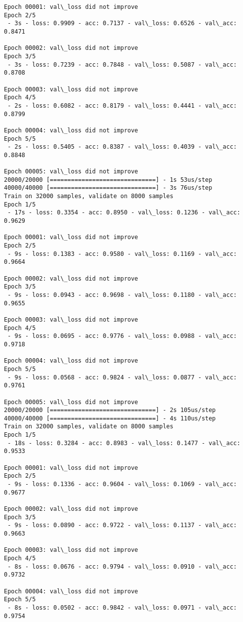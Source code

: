 \documentclass[11pt]{article}
\begin{document}
\begin{Verbatim}[commandchars=\\\{\}]
Epoch 00001: val\_loss did not improve
Epoch 2/5
 - 3s - loss: 0.9909 - acc: 0.7137 - val\_loss: 0.6526 - val\_acc: 0.8471

Epoch 00002: val\_loss did not improve
Epoch 3/5
 - 3s - loss: 0.7239 - acc: 0.7848 - val\_loss: 0.5087 - val\_acc: 0.8708

Epoch 00003: val\_loss did not improve
Epoch 4/5
 - 2s - loss: 0.6082 - acc: 0.8179 - val\_loss: 0.4441 - val\_acc: 0.8799

Epoch 00004: val\_loss did not improve
Epoch 5/5
 - 2s - loss: 0.5405 - acc: 0.8387 - val\_loss: 0.4039 - val\_acc: 0.8848

Epoch 00005: val\_loss did not improve
20000/20000 [==============================] - 1s 53us/step
40000/40000 [==============================] - 3s 76us/step
Train on 32000 samples, validate on 8000 samples
Epoch 1/5
 - 17s - loss: 0.3354 - acc: 0.8950 - val\_loss: 0.1236 - val\_acc: 0.9629

Epoch 00001: val\_loss did not improve
Epoch 2/5
 - 9s - loss: 0.1383 - acc: 0.9580 - val\_loss: 0.1169 - val\_acc: 0.9664

Epoch 00002: val\_loss did not improve
Epoch 3/5
 - 9s - loss: 0.0943 - acc: 0.9698 - val\_loss: 0.1180 - val\_acc: 0.9655

Epoch 00003: val\_loss did not improve
Epoch 4/5
 - 9s - loss: 0.0695 - acc: 0.9776 - val\_loss: 0.0988 - val\_acc: 0.9718

Epoch 00004: val\_loss did not improve
Epoch 5/5
 - 9s - loss: 0.0568 - acc: 0.9824 - val\_loss: 0.0877 - val\_acc: 0.9761

Epoch 00005: val\_loss did not improve
20000/20000 [==============================] - 2s 105us/step
40000/40000 [==============================] - 4s 110us/step
Train on 32000 samples, validate on 8000 samples
Epoch 1/5
 - 18s - loss: 0.3284 - acc: 0.8983 - val\_loss: 0.1477 - val\_acc: 0.9533

Epoch 00001: val\_loss did not improve
Epoch 2/5
 - 9s - loss: 0.1336 - acc: 0.9604 - val\_loss: 0.1069 - val\_acc: 0.9677

Epoch 00002: val\_loss did not improve
Epoch 3/5
 - 9s - loss: 0.0890 - acc: 0.9722 - val\_loss: 0.1137 - val\_acc: 0.9663

Epoch 00003: val\_loss did not improve
Epoch 4/5
 - 8s - loss: 0.0676 - acc: 0.9794 - val\_loss: 0.0910 - val\_acc: 0.9732

Epoch 00004: val\_loss did not improve
Epoch 5/5
 - 8s - loss: 0.0502 - acc: 0.9842 - val\_loss: 0.0971 - val\_acc: 0.9754


\end{Verbatim}
\end{document}
